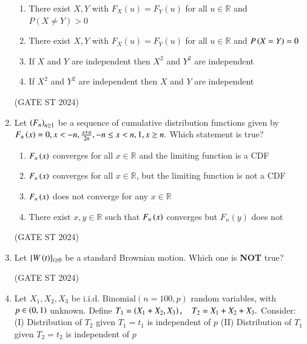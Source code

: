 \documentclass[journal,12pt,onecolumn]{IEEEtran}
\theoremstyle{remark}
\begin{document}
\begin{enumerate}
\begin{enumerate}
\item There exist $X,Y$ with $F_X(u) = F_Y(u)$ for all $u\in\mathbb{R}$ and $P(X \neq Y) > 0$
\item There exist $X,Y$ with $F_X(u) = F_Y(u)$ for all $u\in\mathbb{R}$ and $P\left(X = Y\right) = 0$
\item If $X$ and $Y$ are independent then $X^2$ and $Y^2$ are independent
\item If $X^2$ and $Y^2$ are independent then $X$ and $Y$ are independent
\end{enumerate}
\hfill (GATE ST 2024)
\item 
Let $\left(F_n\right)_{n\ge1}$ be a sequence of cumulative distribution functions given by
$
F_n\left(x\right) =
0, x < \--n, \\
\frac{x+n}{2n},  \--n \le x < n, \\
1, x \ge n.
$
Which statement is true?

\begin{enumerate}
\item $F_n\left(x\right)$ converges for all $x\in\mathbb{R}$ and the limiting function is a CDF
\item $F_n\left(x\right)$ converges for all $x\in\mathbb{R}$, but the limiting function is not a CDF
\item $F_n\left(x\right)$ does not converge for any $x\in\mathbb{R}$
\item There exist $x,y\in\mathbb{R}$ such that $F_n\left(x\right)$ converges but $F_n(y)$ does not
\end{enumerate}
\hfill (GATE ST 2024)
\item 
Let $\{W\left(t\right)\}_{t\ge 0}$ be a standard Brownian motion. Which one is \textbf{NOT} true?

\begin{enumerate}
\end{enumerate}
\hfill (GATE ST 2024)
\item 
Let $X_1, X_2, X_3$ be i.i.d. $\mathrm{Binomial}(n=100, p)$ random variables, with $p\in\left(0,1\right)$ unknown. Define
$
T_1 = \left(X_1 + X_2, X_3\right), \quad T_2 = X_1 + X_2 + X_3.
$
Consider:  
(I) Distribution of $T_2$ given $T_1 = t_1$ is independent of $p$  
(II) Distribution of $T_1$ given $T_2 = t_2$ is independent of $p$


\end{enumerate}
\end{document}
